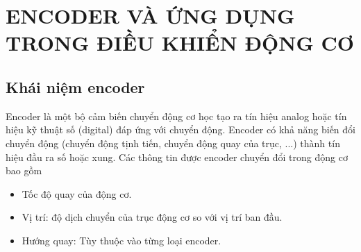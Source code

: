 \chapter{ENCODER VÀ ỨNG DỤNG TRONG ĐIỀU KHIỂN ĐỘNG CƠ}
    \section{Khái niệm encoder}
        Encoder là một bộ cảm biến chuyển động cơ học tạo ra tín hiệu analog hoặc tín hiệu kỹ thuật số (digital) đáp ứng với chuyển động. Encoder có khả năng biến đổi chuyển động (chuyển động tịnh tiến, chuyển động quay của trục, ...) thành tín hiệu đầu ra số hoặc xung. Các thông tin được encoder chuyển đổi trong động cơ bao gồm
        \begin{itemize}
            \item Tốc độ quay của động cơ.
            \item Vị trí: độ dịch chuyển của trục động cơ so với vị trí ban đầu.
            \item Hướng quay: Tùy thuộc vào từng loại encoder.
        \end{itemize}


